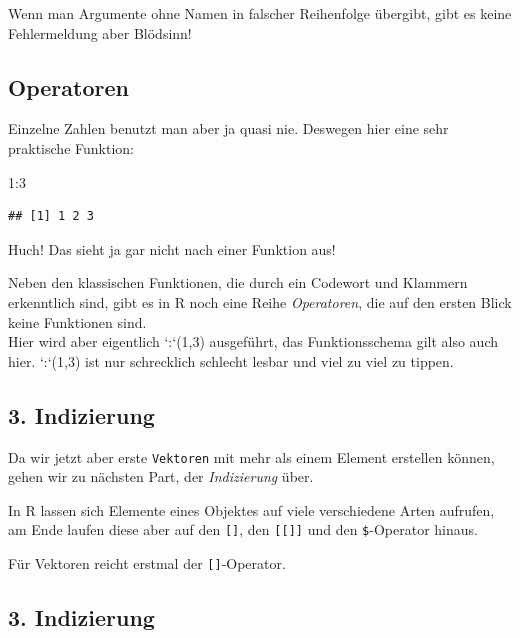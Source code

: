 \documentclass[
]{book}
\newenvironment{Shaded}{\begin{snugshade}}{\end{snugshade}}
\newcommand{\DecValTok}[1]{\textcolor[rgb]{0.00,0.00,0.81}{#1}}
\newcommand{\SpecialCharTok}[1]{\textcolor[rgb]{0.00,0.00,0.00}{#1}}
\begin{document}
Wenn man Argumente ohne Namen in falscher Reihenfolge übergibt, gibt es keine Fehlermeldung aber Blödsinn!

\hypertarget{operatoren}{%
\subsection{Operatoren}\label{operatoren}}

Einzelne Zahlen benutzt man aber ja quasi nie. Deswegen hier eine sehr praktische Funktion:

\begin{Shaded}
\begin{Highlighting}[]
\DecValTok{1}\SpecialCharTok{:}\DecValTok{3}
\end{Highlighting}
\end{Shaded}

\begin{verbatim}
## [1] 1 2 3
\end{verbatim}

Huch! Das sieht ja gar nicht nach einer Funktion aus!

Neben den klassischen Funktionen, die durch ein Codewort und Klammern erkenntlich sind, gibt es in R noch eine Reihe \emph{Operatoren}, die auf den ersten Blick keine Funktionen sind.\\
Hier wird aber eigentlich `:`(1,3) ausgeführt, das Funktionsschema gilt also auch hier. `:`(1,3) ist nur schrecklich schlecht lesbar und viel zu viel zu tippen.

\hypertarget{indizierung}{%
\subsection{3. Indizierung}\label{indizierung}}

Da wir jetzt aber erste \texttt{Vektoren} mit mehr als einem Element erstellen können, gehen wir zu nächsten Part, der \emph{Indizierung} über.

In R lassen sich Elemente eines Objektes auf viele verschiedene Arten aufrufen, am Ende laufen diese aber auf den \texttt{{[}{]}}, den \texttt{{[}{[}{]}{]}} und den \texttt{\$}-Operator hinaus.

Für Vektoren reicht erstmal der \texttt{{[}{]}}-Operator.

\hypertarget{indizierung-1}{%
\subsection{3. Indizierung}\label{indizierung-1}}
\end{document}
